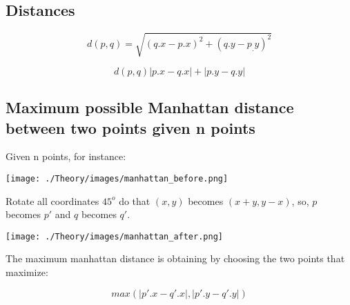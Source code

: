 \subsection{Distances}

$$ d(p,q) = {\sqrt {(q.x-p.x)^{2}+(q.y-p_.y)^{2}}} $$

$$ d(p,q) |p.x - q.x| + |p.y - q.y| $$

\subsection{Maximum possible Manhattan distance between two points given n points}

Given n points, for instance:
\begin{center}
  \texttt{[image: ./Theory/images/manhattan\_before.png]}
\end{center}

Rotate all coordinates $45^{o}$ do that $(x, y)$ becomes $(x+y, y-x)$, so, $p$ becomes $p'$ and $q$ becomes $q'$.
\begin{center}
  \texttt{[image: ./Theory/images/manhattan\_after.png]}
\end{center}

The maximum manhattan distance is obtaining by choosing the two points that maximize:

$$ max(|p'.x - q'.x|, |p'.y - q'.y|) $$